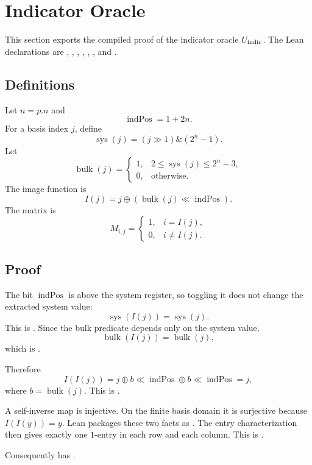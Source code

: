 \section{Indicator Oracle}

This section exports the compiled proof of the indicator oracle
\(U_{\mathrm{indic}}\).  The Lean declarations are
, ,
,
,
,
, and
.

\subsection{Definitions}

Let \(n=p.n\) and
\[
  \operatorname{indPos}=1+2n.
\]
For a basis index \(j\), define
\[
  \operatorname{sys}(j)=
  (j\gg 1)\mathbin{\&}(2^n-1).
\]
Let
\[
  \operatorname{bulk}(j)=
  \begin{cases}
  1, & 2\le \operatorname{sys}(j)\le 2^n-3,\\
  0, & \text{otherwise}.
  \end{cases}
\]
The image function is
\[
  I(j)=j\oplus(\operatorname{bulk}(j)\ll \operatorname{indPos}).
\]
The matrix is
\[
  M_{i,j}=
  \begin{cases}
  1, & i=I(j),\\
  0, & i\ne I(j).
  \end{cases}
\]

\subsection{Proof}

The bit \(\operatorname{indPos}\) is above the system register, so toggling it
does not change the extracted system value:
\[
  \operatorname{sys}(I(j))=\operatorname{sys}(j).
\]
This is .  Since the bulk
predicate depends only on the system value,
\[
  \operatorname{bulk}(I(j))=\operatorname{bulk}(j),
\]
which is .

Therefore
\[
  I(I(j))
  =j\oplus b\ll\operatorname{indPos}\oplus b\ll\operatorname{indPos}
  =j,
\]
where \(b=\operatorname{bulk}(j)\).  This is
.

A self-inverse map is injective.  On the finite basis domain it is surjective
because \(I(I(y))=y\).  Lean packages these two facts as
.  The entry characterization
 then gives exactly one \(1\)-entry in
each row and each column.  This is
.

Consequently  has
.
